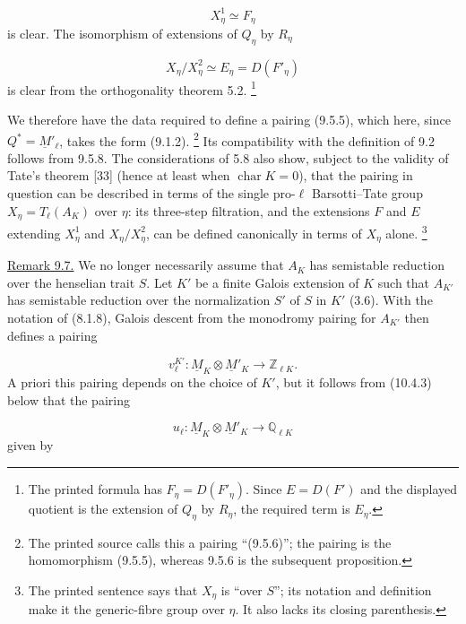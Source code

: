 \begin{equation*}
X^1_\eta\simeq F_\eta
\end{equation*}
is clear. The isomorphism of extensions of $Q_\eta$ by $R_\eta$

\begin{equation*}
X_\eta/X^2_\eta\simeq E_\eta=D(F'_\eta)
\end{equation*}
is clear from the orthogonality theorem 5.2.
\footnote{The printed formula has $F_\eta=D(F'_\eta)$. Since
$E=D(F')$ and the displayed quotient is the extension of $Q_\eta$ by
$R_\eta$, the required term is $E_\eta$.}

We therefore have the data required to define a pairing (9.5.5), which
here, since $Q^*=\underline M'_\ell$, takes the form (9.1.2).
\footnote{The printed source calls this a pairing ``(9.5.6)''; the pairing
is the homomorphism (9.5.5), whereas 9.5.6 is the subsequent proposition.}
Its compatibility with the definition of 9.2 follows from 9.5.8. The
considerations of 5.8 also show, subject to the validity of Tate's theorem
[33] (hence at least when $\operatorname{char}K=0$), that the pairing in
question can be described in terms of the single pro-$\ell$
Barsotti--Tate group $X_\eta=T_\ell(A_K)$ over $\eta$: its three-step
filtration, and the extensions $F$ and $E$ extending $X^1_\eta$ and
$X_\eta/X^2_\eta$, can be defined canonically in terms of $X_\eta$ alone.
\footnote{The printed sentence says that $X_\eta$ is ``over $S$''; its
notation and definition make it the generic-fibre group over $\eta$. It
also lacks its closing parenthesis.}

\medskip
\noindent
\underline{Remark 9.7.} We no longer necessarily assume that $A_K$ has
semistable reduction over the henselian trait $S$. Let $K'$ be a finite
Galois extension of $K$ such that $A_{K'}$ has semistable reduction over
the normalization $S'$ of $S$ in $K'$ (3.6). With the notation of (8.1.8),
Galois descent from the monodromy pairing for $A_{K'}$ then defines a
pairing

\begin{equation}\tag{*}
v_\ell^{K'}:\underline M_K\otimes\underline M'_K
 \longrightarrow\mathbb Z_{\ell K}.
\end{equation}
A priori this pairing depends on the choice of $K'$, but it follows from
(10.4.3) below that the pairing

\begin{equation}\tag{9.7.1}
u_\ell:\underline M_K\otimes\underline M'_K
 \longrightarrow\mathbb Q_{\ell K}
\end{equation}
given by

